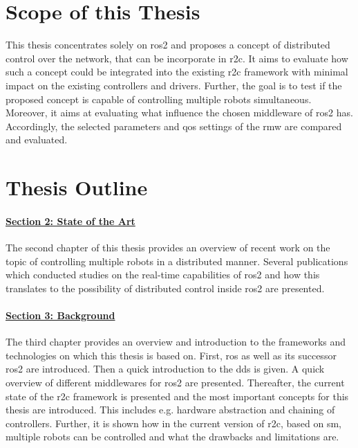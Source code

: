 \section{Scope of this Thesis}
This thesis concentrates solely on \gls{ros2} and proposes a concept of distributed control over the network, that can be incorporate in \gls{r2c}. It aims to evaluate how such a concept could be integrated into the existing \gls{r2c} framework with minimal impact on the existing controllers and drivers. Further, the goal is to test if the proposed concept is capable of controlling multiple robots simultaneous. Moreover, it aims at evaluating what influence the chosen middleware of \gls{ros2} has. Accordingly, the selected parameters and \gls{qos} settings of the \gls{rmw} are compared and evaluated.


\section{Thesis Outline}
\paragraph{\hyperref[sec:state_of_the_art]{Section 2: State of the Art}}
The second chapter of this thesis provides an overview of recent work on the topic of controlling multiple robots in a distributed manner. Several publications which conducted studies on the real-time capabilities of \gls{ros2} and how this translates to the possibility of distributed control inside \gls{ros2} are presented.

\paragraph{\hyperref[sec:background]{Section 3: Background}}
The third chapter provides an overview and introduction to the frameworks and technologies on which this thesis is based on. First, \gls{ros} as well as its successor \gls{ros2} are introduced. Then a quick introduction to the \acrlong{dds} is given. A quick overview of different middlewares for \gls{ros2} are presented. Thereafter, the current state of the \gls{r2c} framework is presented and the most important concepts for this thesis are introduced. This includes e.g. hardware abstraction and chaining of controllers. Further, it is shown how in the current version of \gls{r2c}, based on \acrlong{sm}, multiple robots can be controlled and what the drawbacks and limitations are.


